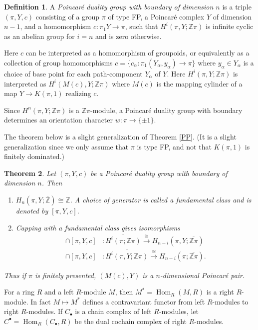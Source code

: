 \documentclass[12pt]{amsart}
\newtheorem{theorem}{Theorem}
\theoremstyle{definition}
\newtheorem{definition}[theorem]{Definition}
\newcommand{\Z}{\mathbb Z}
\DeclareMathOperator{\Hom}{Hom}
\newcommand{\ol}[1]{{\overline{#1}}}
\newcommand{\zp}{\Z\pi}
\begin{document}
\begin{definition} \label{pdgb}
A {\em Poincar\'e duality group with boundary of dimension $n$} is a triple $(\pi,Y,c)$ consisting of a group $\pi$ of type FP, a Poincar\'e complex $Y$ of dimension $n-1$, and a homomorphism $c: \pi_1Y \to \pi$, such
 that $H^i(\pi,Y;\zp)$ is infinite cyclic as an abelian group for $i = n$ and is zero otherwise.   
\end{definition}

Here $c$ can be interpreted as a homomorphism of  groupoids, or equivalently as a collection of group homomorphisms $c = \{c_\alpha : \pi_1(Y_\alpha,y_\alpha)\to \pi\}$ where $y_\alpha \in Y_\alpha$ is a choice of base point for each path-component $Y_\alpha$ of $Y$.   Here $H^i(\pi,Y;\Z\pi)$ is interpreted as $H^i(M(c),Y;\zp)$ where $M(c)$ is the mapping cylinder of a map $Y \to K(\pi,1)$ realizing $c$.



Since $H^n(\pi,Y;\Z \pi)$ is a $\Z\pi$-module, a Poincar\'e duality group with boundary determines an orientation character $w : \pi \to \{\pm 1\}$.

The theorem below is a slight generalization of Theorem \ref{PP}.   (It is a slight generalization since we only assume that $\pi$ is type FP, and not that $K(\pi,1)$ is finitely dominated.)
\begin{theorem} \label{PDn_theorem}
 Let $(\pi,Y,c)$ be a Poincar\'e duality group with boundary of dimension $n$. Then 
\begin{enumerate}
\item $H_n(\pi,Y;\ol \Z) \cong \Z$.   A choice of generator is called a {\em fundamental class} and is denoted by $[\pi,Y,c]$.
\item  Capping with a fundamental class gives isomorphisms
 \begin{align*}
  \cap [\pi,Y,c] & :  \ol{H^i(\pi; \Z\pi)} \xrightarrow{\cong} H_{n-i}(\pi,Y; \ol {\Z\pi}) \\
  \cap [\pi,Y,c] & :  \ol{H^i(\pi,Y; \Z\pi)} \xrightarrow{\cong} H_{n-i}(\pi;\ol {\Z\pi}).
 \end{align*}
\end{enumerate}
Thus if $\pi$ is finitely presented, $(M(c),Y)$ is a $n$-dimensional Poincar\'e pair.
 \end{theorem}
 
 For a ring $R$ and a left $R$-module $M$, then $M^* = \Hom_R(M,R)$ is a  right $R$-module.  In fact $M \mapsto M^*$ defines a contravariant functor from left $R$-modules to right $R$-modules.   If $C_{\bullet}$ is a chain complex of left $R$-modules, let $C^\bullet = \Hom_R(C_\bullet,R)$ be the dual cochain complex of right $R$-modules.
 
\end{document}
